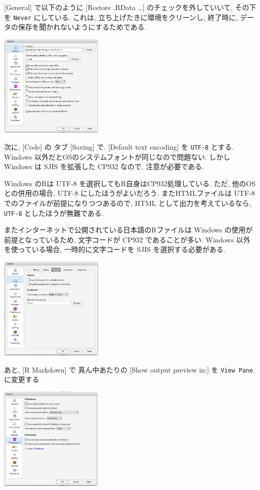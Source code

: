 \documentclass[
  letterpaper,
  xelatex,
  ja=standard, xelatex]{bxjsbook}
\begin{document}
{[}General{]} で以下のように {[}Restore .RData \ldots{]}
のチェックを外していいて, その下を \texttt{Never} にしている. これは,
立ち上げたきに環境をクリーンし, 終了時に,
データの保存を聞かれないようにするためである.

\includegraphics[width=1.95in,height=\textheight]{figs/rstudio-general.PNG}

次に, {[}Code{]} の タブ {[}Saving{]} で. {[}Default text encoding{]} を
\texttt{UTF-8} とする. Windows
以外だとOSのシステムフォントが同じなので問題ない. しかし Windows は SJIS
を拡張した CP932 なので, 注意が必要である.

Windows のRは UTF-8 を選択してもR自身はCP932処理している. ただ,
他のOSとの併用の場合, UTF-8 にしたほうがよいだろう. またHTMLファイルは
UTF-8 でのファイルが前提になりつつあるので, HTML
として出力を考えているなら, \texttt{UTF-8} としたほうが無難である.

またインターネットで公開されている日本語のRファイルは Windows
の使用が前提となっているため, 文字コードが CP932 であることが多い.
Windows 以外を使っている場合, 一時的に文字コードを SJIS
を選択する必要がある.

\includegraphics[width=1.97in,height=\textheight]{figs/rstudio-utf8.PNG}

あと, {[}R Markdown{]} で 真ん中あたりの {[}Show output preview in:{]}
を \texttt{View\ Pane} に変更する

\includegraphics[width=1.95in,height=\textheight]{figs/rstudio-rmd.PNG}
\end{document}

